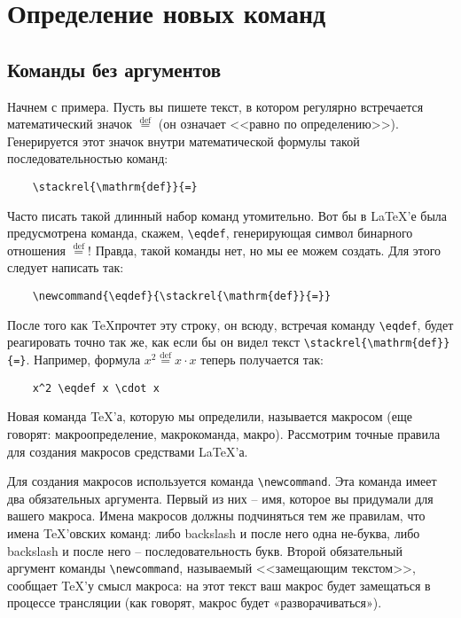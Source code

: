 \chapter{Определение новых команд}
\section{Команды без аргументов}

Начнем с примера. Пусть вы пишете текст, в котором регулярно встречается математический значок $\stackrel{\mathrm{def}}{=}$ (он означает <<равно по определению>>). Генерируется этот значок внутри математической формулы такой последовательностью команд:

\begin{verbatim}
	\stackrel{\mathrm{def}}{=}
\end{verbatim}

Часто писать такой длинный набор команд утомительно. Вот бы в \LaTeX’е была предусмотрена команда, скажем, \verb"\eqdef", генерирующая символ бинарного отношения $\stackrel{\mathrm{def}}{=}$! Правда, такой команды нет, но мы ее можем создать. Для этого следует написать так:

\begin{verbatim}
	\newcommand{\eqdef}{\stackrel{\mathrm{def}}{=}}
\end{verbatim}

\newcommand{\eqdef}{\stackrel{\mathrm{def}}{=}}

После того как \TeX прочтет эту строку, он всюду, встречая команду \verb"\eqdef", будет реагировать точно так же, как если бы он видел текст \verb"\stackrel{\mathrm{def}}{=}". Например, формула $x^2 \eqdef x \cdot x$ теперь получается так:

\begin{verbatim}
	x^2 \eqdef x \cdot x
\end{verbatim}

Новая команда \TeX’а, которую мы определили, называется макросом (еще говорят: макроопределение, макрокоманда, макро). Рассмотрим точные правила для создания макросов средствами \LaTeX’а.

Для создания макросов используется команда \verb"\newcommand". Эта команда имеет два обязательных аргумента. Первый из них -- имя, которое вы придумали для вашего макроса. Имена макросов должны подчиняться тем же правилам, что имена \TeX’овских команд: либо backslash и после него одна не-буква, либо backslash и после него -- последовательность букв. Второй обязательный аргумент команды \verb"\newcommand", называемый <<замещающим текстом>>, сообщает \TeX’у смысл макроса: на этот текст ваш макрос будет замещаться в процессе трансляции (как говорят, макрос будет «разворачиваться»).

